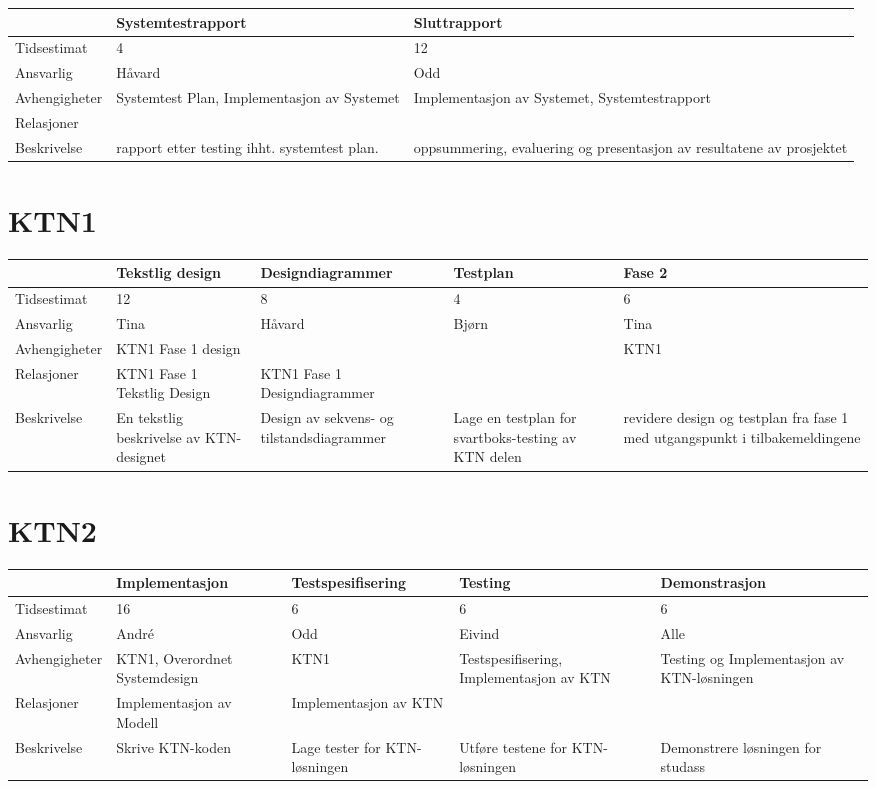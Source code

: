 \documentclass{article}
\begin{document}
\begin{tabular}{|l|p{3cm}|p{3cm}|}
\hline
& Systemtestrapport & Sluttrapport \\ \hline
Tidsestimat & 4 & 12 \\ \hline
Ansvarlig & H\aa vard & Odd \\ \hline
Avhengigheter & Systemtest Plan, Implementasjon av Systemet & Implementasjon
av Systemet, Systemtestrapport \\ \hline
Relasjoner &  &  \\ \hline
Beskrivelse & rapport etter testing ihht. systemtest plan. & oppsummering,
evaluering og presentasjon av resultatene av prosjektet \\ \hline
\end{tabular}
\newpage

\section{KTN1}

\begin{tabular}{|l|p{3cm}|p{3cm}|p{3cm}|p{3cm}|}
\hline
& Tekstlig design & Designdiagrammer & Testplan & Fase 2 \\ \hline
Tidsestimat & 12 & 8 & 4 & 6 \\ \hline
Ansvarlig & Tina & H\aa vard & Bj\o rn & Tina \\ \hline
Avhengigheter & KTN1 Fase 1 design &  &  & KTN1 \\ \hline
Relasjoner & KTN1 Fase 1 Tekstlig Design & KTN1 Fase 1 Designdiagrammer &  & 
\\ \hline
Beskrivelse & En tekstlig beskrivelse av KTN-designet & Design av sekvens-
og tilstandsdiagrammer & Lage en testplan for svartboks-testing av KTN delen
& revidere design og testplan fra fase 1 med utgangspunkt i tilbakemeldingene
\\ \hline
\end{tabular}

\section{KTN2}

\begin{tabular}{|l|p{3cm}|p{3cm}|p{3cm}|p{3cm}|}
\hline
& Implementasjon & Testspesifisering & Testing & Demonstrasjon \\ \hline
Tidsestimat & 16 & 6 & 6 & 6 \\ \hline
Ansvarlig & Andr\'{e} & Odd & Eivind & Alle \\ \hline
Avhengigheter & KTN1, Overordnet Systemdesign & KTN1 & Testspesifisering,
Implementasjon av KTN & Testing og Implementasjon av KTN-l\o sningen \\ 
\hline
Relasjoner & Implementasjon av Modell & Implementasjon av KTN &  &  \\ \hline
Beskrivelse & Skrive KTN-koden & Lage tester for KTN-l\o sningen & Utf\o re
testene for KTN-l\o sningen & Demonstrere l\o sningen for studass \\ \hline
\end{tabular}
\newpage
\end{document}
